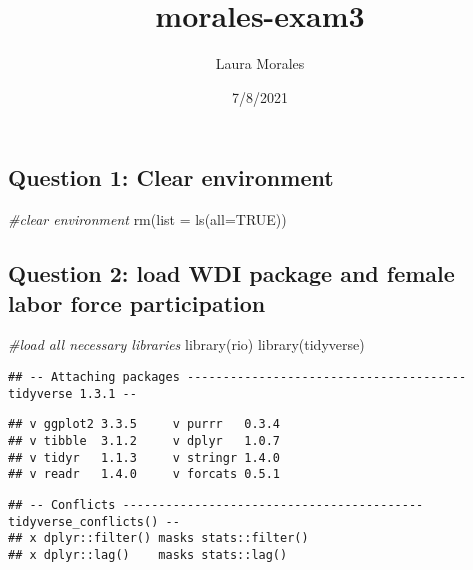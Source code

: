 \documentclass[
]{article}
\title{morales-exam3}
\author{Laura Morales}
\date{7/8/2021}
\newenvironment{Shaded}{\begin{snugshade}}{\end{snugshade}}
\newcommand{\AttributeTok}[1]{\textcolor[rgb]{0.77,0.63,0.00}{#1}}
\newcommand{\CommentTok}[1]{\textcolor[rgb]{0.56,0.35,0.01}{\textit{#1}}}
\newcommand{\ConstantTok}[1]{\textcolor[rgb]{0.00,0.00,0.00}{#1}}
\newcommand{\FunctionTok}[1]{\textcolor[rgb]{0.00,0.00,0.00}{#1}}
\newcommand{\NormalTok}[1]{#1}
\begin{document}
\maketitle

\hypertarget{question-1-clear-environment}{%
\subsection{Question 1: Clear
environment}\label{question-1-clear-environment}}

\begin{Shaded}
\begin{Highlighting}[]
\CommentTok{\#clear environment }
\FunctionTok{rm}\NormalTok{(}\AttributeTok{list =} \FunctionTok{ls}\NormalTok{(}\AttributeTok{all=}\ConstantTok{TRUE}\NormalTok{))}
\end{Highlighting}
\end{Shaded}

\hypertarget{question-2-load-wdi-package-and-female-labor-force-participation}{%
\subsection{Question 2: load WDI package and female labor force
participation}\label{question-2-load-wdi-package-and-female-labor-force-participation}}

\begin{Shaded}
\begin{Highlighting}[]
\CommentTok{\#load all necessary libraries }
\FunctionTok{library}\NormalTok{(rio)}
\FunctionTok{library}\NormalTok{(tidyverse)}
\end{Highlighting}
\end{Shaded}

\begin{verbatim}
## -- Attaching packages --------------------------------------- tidyverse 1.3.1 --
\end{verbatim}

\begin{verbatim}
## v ggplot2 3.3.5     v purrr   0.3.4
## v tibble  3.1.2     v dplyr   1.0.7
## v tidyr   1.1.3     v stringr 1.4.0
## v readr   1.4.0     v forcats 0.5.1
\end{verbatim}

\begin{verbatim}
## -- Conflicts ------------------------------------------ tidyverse_conflicts() --
## x dplyr::filter() masks stats::filter()
## x dplyr::lag()    masks stats::lag()
\end{verbatim}
\end{document}
